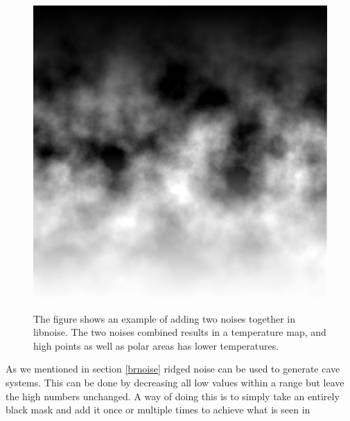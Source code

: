 \begin{figure}[H]
\begin{minipage}[b]{.32\linewidth}
		\label{fig:5b}
	\end{minipage}
	\begin{minipage}[b]{.32\linewidth}
		\includegraphics[width=0.95\linewidth]{img/Temperature}
		\label{fig:5c}
	\end{minipage}
	\centering
	\caption{The figure shows an example of adding two noises together in libnoise. The two noises combined results in a temperature map, and high points as well as polar areas has lower temperatures.}
	\label{fig:Temperature}
\end{figure}

As we mentioned in section \ref{brnoise} ridged noise can be used to generate cave systems. This can be done by decreasing all low values within a range but leave the high numbers unchanged. A way of doing this is to simply take an entirely black mask and add it once or multiple times to achieve what is seen in 

